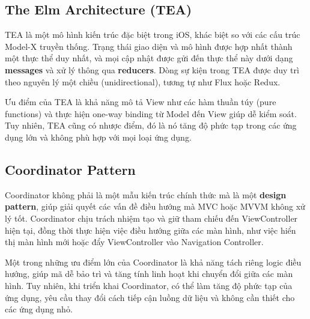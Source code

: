   \subsection{The Elm Architecture (TEA)}

TEA là một mô hình kiến trúc đặc biệt trong iOS, khác biệt so với các cấu trúc Model-X truyền thống. Trạng thái giao diện và mô hình được hợp nhất thành một thực thể duy nhất, và mọi cập nhật được gửi đến thực thể này dưới dạng \textbf{messages} và xử lý thông qua \textbf{reducers}. Dòng sự kiện trong TEA được duy trì theo nguyên lý một chiều (unidirectional), tương tự như Flux hoặc Redux.

\vspace{0.5em}

  Ưu điểm của TEA là khả năng mô tả View như các hàm thuần túy (pure functions) và thực hiện one-way binding từ Model đến View giúp dễ kiểm soát. Tuy nhiên, TEA cũng có nhược điểm, đó là nó tăng độ phức tạp trong các ứng dụng lớn và không phù hợp với mọi loại ứng dụng.

  \subsection{Coordinator Pattern}

Coordinator không phải là một mẫu kiến trúc chính thức mà là một \textbf{design pattern}, giúp giải quyết các vấn đề điều hướng mà MVC hoặc MVVM không xử lý tốt. Coordinator chịu trách nhiệm tạo và giữ tham chiếu đến ViewController hiện tại, đồng thời thực hiện việc điều hướng giữa các màn hình, như việc hiển thị màn hình mới hoặc đẩy ViewController vào Navigation Controller.

\vspace{0.5em}

  Một trong những ưu điểm lớn của Coordinator là khả năng tách riêng logic điều hướng, giúp mã dễ bảo trì và tăng tính linh hoạt khi chuyển đổi giữa các màn hình. Tuy nhiên, khi triển khai Coordinator, có thể làm tăng độ phức tạp của ứng dụng, yêu cầu thay đổi cách tiếp cận luồng dữ liệu và không cần thiết cho các ứng dụng nhỏ.